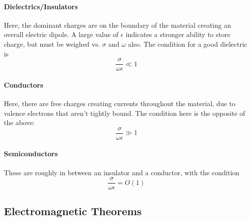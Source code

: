 \documentclass{article}
\numberwithin{equation}{section}
\begin{document}
        \paragraph{Dielectrics/Insulators}
            Here, the dominant charges are on the boundary of the material creating an
            overall electric dipole. A large value of $\epsilon$ indicates a stronger
            ability to store charge, but must be weighed vs. $\sigma$ and $\omega$ also.
            The condition for a good dielectric is
            \begin{equation} 
                \frac{\sigma}{\omega \epsilon} \ll 1
            \end{equation}

        \paragraph{Conductors}
            Here, there are free charges creating currents throughout the material, due to
            valence electrons that aren't tightly bound. The condition here is the
            opposite of the above:
            \begin{equation} \label{eq:conductor}
                \frac{\sigma}{\omega \epsilon} \gg 1
            \end{equation}

        \paragraph{Semiconductors}
            These are roughly in between an insulator and a conductor, with the condition
                \begin{equation} \label{eq:semiconductor}
                    \frac{\sigma}{\omega \epsilon} = O(1)
                \end{equation}
        \newpage
    \subsection{Electromagnetic Theorems}
\end{document}
